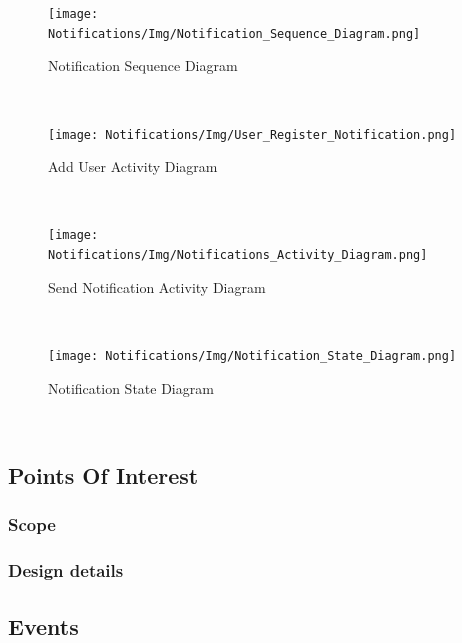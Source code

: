 \documentclass{article}
\begin{document}
    
    \begin{figure}[h!]
        \texttt{[image: Notifications/Img/Notification\_Sequence\_Diagram.png]} \caption{Notification Sequence Diagram}
    \end{figure}
  
    
    \mbox{}\\
    \bigskip
    
    
    \begin{figure}[h!]
        \texttt{[image: Notifications/Img/User\_Register\_Notification.png]} \caption{Add User Activity Diagram}
    \end{figure}
    
    
    \mbox{}\\
    \bigskip
    
    \begin{figure}[h!]
        \texttt{[image: Notifications/Img/Notifications\_Activity\_Diagram.png]} \caption{Send Notification Activity Diagram}
    \end{figure}
    
    
    \mbox{}\\
    \bigskip
   
    
    \begin{figure}[h!]
        \begin{center}
            \texttt{[image: Notifications/Img/Notification\_State\_Diagram.png]} \caption{Notification State Diagram}
        \end{center}
    \end{figure}
    
    \mbox{}\\
    
    \newpage
    
\subsection{Points Of Interest}
\subsubsection{Scope}

\subsubsection{Design details}

\subsection{Events}
\end{document}
